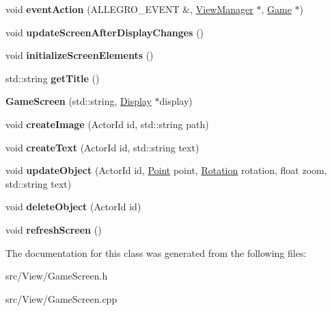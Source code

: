 \begin{DoxyCompactItemize}
\item 
void {\bfseries event\+Action} (A\+L\+L\+E\+G\+R\+O\+\_\+\+E\+V\+E\+NT \&, \hyperlink{classViewManager}{View\+Manager} $\ast$, \hyperlink{classGame}{Game} $\ast$)\hypertarget{classGameScreen_a2ca8233319e849881b40f6b51d70b5c2}{}\label{classGameScreen_a2ca8233319e849881b40f6b51d70b5c2}

\item 
void {\bfseries update\+Screen\+After\+Display\+Changes} ()\hypertarget{classGameScreen_a1f82a990e5a99b6277d61a241f7ee249}{}\label{classGameScreen_a1f82a990e5a99b6277d61a241f7ee249}

\item 
void {\bfseries initialize\+Screen\+Elements} ()\hypertarget{classGameScreen_a5dc1384fa03aa108acb594a25a37c6d3}{}\label{classGameScreen_a5dc1384fa03aa108acb594a25a37c6d3}

\item 
std\+::string {\bfseries get\+Title} ()\hypertarget{classGameScreen_aed6639510a63371edde3c02b8772e965}{}\label{classGameScreen_aed6639510a63371edde3c02b8772e965}

\item 
{\bfseries Game\+Screen} (std\+::string, \hyperlink{classDisplay}{Display} $\ast$display)\hypertarget{classGameScreen_a938d3b8dcd74d5581bce846100893d65}{}\label{classGameScreen_a938d3b8dcd74d5581bce846100893d65}

\item 
void {\bfseries create\+Image} (Actor\+Id id, std\+::string path)\hypertarget{classGameScreen_abeea653575bf8c23ba338e4825ddfceb}{}\label{classGameScreen_abeea653575bf8c23ba338e4825ddfceb}

\item 
void {\bfseries create\+Text} (Actor\+Id id, std\+::string text)\hypertarget{classGameScreen_ae7bf62b6249da58e40dfffa4eb8d8bd9}{}\label{classGameScreen_ae7bf62b6249da58e40dfffa4eb8d8bd9}

\item 
void {\bfseries update\+Object} (Actor\+Id id, \hyperlink{classPoint}{Point} point, \hyperlink{classRotation}{Rotation} rotation, float zoom, std\+::string text)\hypertarget{classGameScreen_abd0496993fd77d75f51076fa4a4d73e3}{}\label{classGameScreen_abd0496993fd77d75f51076fa4a4d73e3}

\item 
void {\bfseries delete\+Object} (Actor\+Id id)\hypertarget{classGameScreen_ad352705fd0b44ec761149670e2b8d9f3}{}\label{classGameScreen_ad352705fd0b44ec761149670e2b8d9f3}

\item 
void {\bfseries refresh\+Screen} ()\hypertarget{classGameScreen_ac789a31dbf548073fc28753704ae8e92}{}\label{classGameScreen_ac789a31dbf548073fc28753704ae8e92}

\end{DoxyCompactItemize}


The documentation for this class was generated from the following files\+:\begin{DoxyCompactItemize}
\item 
src/\+View/Game\+Screen.\+h\item 
src/\+View/Game\+Screen.\+cpp\end{DoxyCompactItemize}
